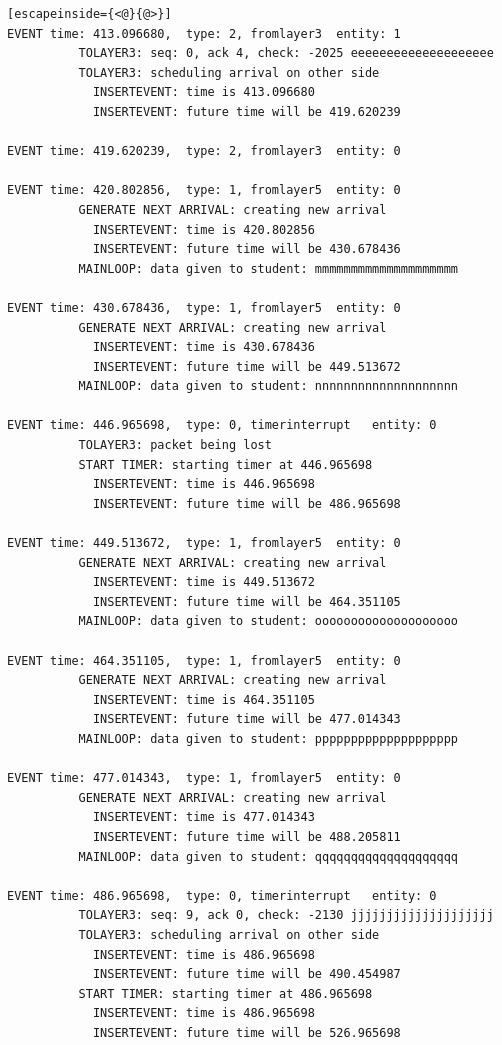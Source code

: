 \documentclass[paper=a4, fontsize=11pt]{scrartcl}
\numberwithin{equation}{section}		%
\numberwithin{figure}{section}			%
\numberwithin{table}{section}				%
\begin{document}
\begin{lstlisting}[escapeinside={<@}{@>}]
EVENT time: 413.096680,  type: 2, fromlayer3  entity: 1
          TOLAYER3: seq: 0, ack 4, check: -2025 eeeeeeeeeeeeeeeeeeee
          TOLAYER3: scheduling arrival on other side
            INSERTEVENT: time is 413.096680
            INSERTEVENT: future time will be 419.620239

EVENT time: 419.620239,  type: 2, fromlayer3  entity: 0

EVENT time: 420.802856,  type: 1, fromlayer5  entity: 0
          GENERATE NEXT ARRIVAL: creating new arrival
            INSERTEVENT: time is 420.802856
            INSERTEVENT: future time will be 430.678436
          MAINLOOP: data given to student: mmmmmmmmmmmmmmmmmmmm

EVENT time: 430.678436,  type: 1, fromlayer5  entity: 0
          GENERATE NEXT ARRIVAL: creating new arrival
            INSERTEVENT: time is 430.678436
            INSERTEVENT: future time will be 449.513672
          MAINLOOP: data given to student: nnnnnnnnnnnnnnnnnnnn

EVENT time: 446.965698,  type: 0, timerinterrupt   entity: 0
          TOLAYER3: packet being lost
          START TIMER: starting timer at 446.965698
            INSERTEVENT: time is 446.965698
            INSERTEVENT: future time will be 486.965698

EVENT time: 449.513672,  type: 1, fromlayer5  entity: 0
          GENERATE NEXT ARRIVAL: creating new arrival
            INSERTEVENT: time is 449.513672
            INSERTEVENT: future time will be 464.351105
          MAINLOOP: data given to student: oooooooooooooooooooo

EVENT time: 464.351105,  type: 1, fromlayer5  entity: 0
          GENERATE NEXT ARRIVAL: creating new arrival
            INSERTEVENT: time is 464.351105
            INSERTEVENT: future time will be 477.014343
          MAINLOOP: data given to student: pppppppppppppppppppp

EVENT time: 477.014343,  type: 1, fromlayer5  entity: 0
          GENERATE NEXT ARRIVAL: creating new arrival
            INSERTEVENT: time is 477.014343
            INSERTEVENT: future time will be 488.205811
          MAINLOOP: data given to student: qqqqqqqqqqqqqqqqqqqq

EVENT time: 486.965698,  type: 0, timerinterrupt   entity: 0
          TOLAYER3: seq: 9, ack 0, check: -2130 jjjjjjjjjjjjjjjjjjjj
          TOLAYER3: scheduling arrival on other side
            INSERTEVENT: time is 486.965698
            INSERTEVENT: future time will be 490.454987
          START TIMER: starting timer at 486.965698
            INSERTEVENT: time is 486.965698
            INSERTEVENT: future time will be 526.965698


\end{lstlisting}
\end{document}

